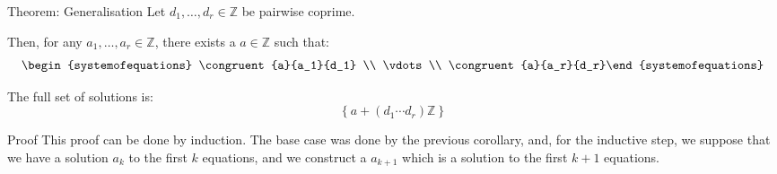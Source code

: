 \documentclass[a4paper]{article}
\begin{document}
\begin{parag}{Theorem: Generalisation}
    Let $d_1, \ldots, d_r \in \mathbb{Z}$ be pairwise coprime.

    Then, for any $a_1, \ldots, a_r \in \mathbb{Z}$, there exists a $a \in \mathbb{Z}$ such that: 
    \[\begin{systemofequations} \congruent{a}{a_1}{d_1} \\ \vdots \\ \congruent{a}{a_r}{d_r}\end{systemofequations}\]
    
    The full set of solutions is: 
    \[\left\{a + \left(d_1 \cdots d_r\right)\mathbb{Z}\right\}\]
    
    \begin{subparag}{Proof}
        This proof can be done by induction. The base case was done by the previous corollary, and, for the inductive step, we suppose that we have a solution $a_k$ to the first $k$ equations, and we construct a $a_{k+1}$ which is a solution to the first $k+1$ equations.
    \end{subparag}
\end{parag}
\end{document}
